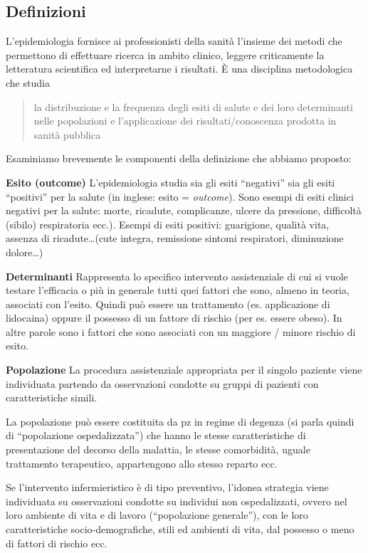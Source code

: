 \documentclass[]{book}
\begin{document}
\hypertarget{definizioni}{%
\subsection{Definizioni}\label{definizioni}}

L'epidemiologia fornisce ai professionisti della sanità l'insieme dei metodi che permettono di effettuare ricerca in ambito clinico, leggere criticamente la letteratura scientifica ed interpretarne i risultati. È una disciplina metodologica che studia

\begin{quote}
la distribuzione e la frequenza degli esiti di salute e dei loro determinanti nelle popolazioni e l'applicazione dei risultati/conoscenza prodotta in sanità pubblica
\end{quote}

Esaminiamo brevemente le componenti della definizione che abbiamo proposto:

\textbf{Esito (outcome)} L'epidemiologia studia sia gli esiti ``negativi'' sia gli esiti ``positivi'' per la salute (in inglese: esito = \emph{outcome}). Sono esempi di esiti clinici negativi per la salute: morte, ricadute, complicanze, ulcere da pressione, difficoltà (sibilo) respiratoria ecc.). Esempi di esiti positivi: guarigione, qualità vita, assenza di ricadute\ldots{}(cute integra, remissione sintomi respiratori, diminuzione dolore\ldots{})

\textbf{Determinanti} Rappresenta lo specifico intervento assistenziale di cui si vuole testare l'efficacia o più in generale tutti quei fattori che sono, almeno in teoria, associati con l'esito. Quindi può essere un trattamento (es. applicazione di lidocaina) oppure il possesso di un fattore di rischio (per es. essere obeso). In altre parole sono i fattori che sono associati con un maggiore / minore rischio di esito.

\textbf{Popolazione} La procedura assistenziale appropriata per il singolo paziente viene individuata partendo da osservazioni condotte su gruppi di pazienti con caratteristiche simili.

La popolazione può essere costituita da pz in regime di degenza (si parla quindi di ``popolazione ospedalizzata'') che hanno le stesse caratteristiche di presentazione del decorso della malattia, le stesse comorbidità, uguale trattamento terapeutico, appartengono allo stesso reparto ecc.

Se l'intervento infermieristico è di tipo preventivo, l'idonea strategia viene individuata su osservazioni condotte su individui non ospedalizzati, ovvero nel loro ambiente di vita e di lavoro (``popolazione generale''), con le loro caratteristiche socio-demografiche, stili ed ambienti di vita, dal possesso o meno di fattori di rischio ecc.
\end{document}
